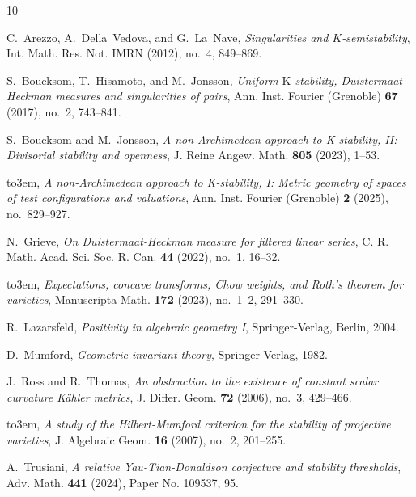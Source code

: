 \documentclass[12pt]{amsart}
\theoremstyle{definition}
\numberwithin{equation}{section}
\begin{document}
\providecommand{\bysame}{\leavevmode\hbox to3em{\hrulefill}\thinspace}
\providecommand{\MR}{\relax\ifhmode\unskip\space\fi MR }
\providecommand{\MRhref}[2]{%
  \href{http://www.ams.org/mathscinet-getitem?mr=#1}{#2}
}
\providecommand{\href}[2]{#2}
\begin{thebibliography}{10}

C.~Arezzo, A.~Della~Vedova, and G.~La~Nave, \emph{Singularities and
  {$K$}-semistability}, Int. Math. Res. Not. IMRN (2012), no.~4, 849--869.

S.~Boucksom, T.~Hisamoto, and M.~Jonsson, \emph{Uniform
  {$\mathrm{K}$}-stability, {D}uistermaat-{H}eckman measures and singularities
  of pairs}, Ann. Inst. Fourier (Grenoble) \textbf{67} (2017), no.~2, 743--841.

S.~Boucksom and M.~Jonsson, \emph{A non-{A}rchimedean approach to
  {K}-stability, {II}: {D}ivisorial stability and openness}, J. Reine Angew.
  Math. \textbf{805} (2023), 1--53.

\bysame, \emph{A non-{A}rchimedean approach to {K}-stability, {I}: {M}etric
  geometry of spaces of test configurations and valuations}, Ann. Inst. Fourier
  (Grenoble) \textbf{2} (2025), no.~829--927.

N.~Grieve, \emph{{O}n {D}uistermaat-{H}eckman measure for filtered linear
  series}, C. R. Math. Acad. Sci. Soc. R. Can. \textbf{44} (2022), no.~1,
  16--32.

\bysame, \emph{Expectations, concave transforms, {C}how weights, and {R}oth's
  theorem for varieties}, Manuscripta Math. \textbf{172} (2023), no.~1--2,
  291--330.

R.~Lazarsfeld, \emph{Positivity in algebraic geometry {I}}, Springer-Verlag,
  Berlin, 2004.

D.~Mumford, \emph{Geometric invariant theory}, Springer-Verlag, 1982.

J.~Ross and R.~Thomas, \emph{An obstruction to the existence of constant scalar
  curvature {K}\"{a}hler metrics}, J. Differ. Geom. \textbf{72} (2006), no.~3,
  429--466.

\bysame, \emph{A study of the {H}ilbert-{M}umford criterion for the stability
  of projective varieties}, J. Algebraic Geom. \textbf{16} (2007), no.~2,
  201--255.

A.~Trusiani, \emph{A relative {Y}au-{T}ian-{D}onaldson conjecture and stability
  thresholds}, Adv. Math. \textbf{441} (2024), Paper No. 109537, 95.

\end{thebibliography}

%
%
\end{document}
